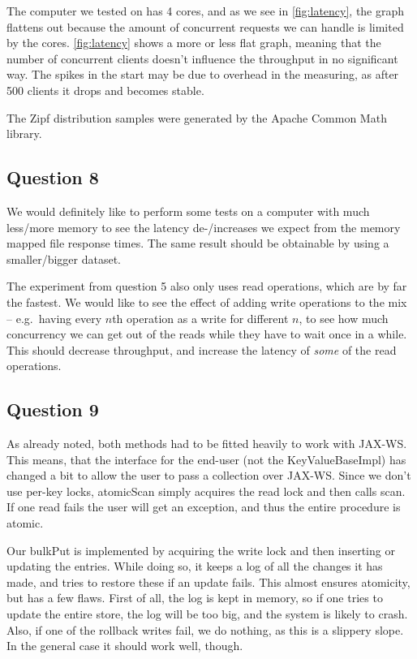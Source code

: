\documentclass[a4paper,final]{article}
\newcommand{\mono}[1]{{\ttfamily#1}}
\begin{document}
The computer we tested on has 4 cores, and as we see in \autoref{fig:latency},
the graph flattens out because the amount of concurrent requests we can handle
is limited by the cores. \autoref{fig:latency} shows a more or less flat graph,
meaning that the number of concurrent clients doesn't influence the throughput
in no significant way. The spikes in the start may be due to overhead in the
measuring, as after 500 clients it drops and becomes stable.

The Zipf distribution samples were generated by the Apache Common Math library.

\subsection*{Question 8}
We would definitely like to perform some tests on a computer with much
less/more memory to see the latency de-/increases we expect from the
memory mapped file response times. The same result should be obtainable by
using a smaller/bigger dataset.

The experiment from question 5 also only uses \mono{read} operations, which
are by far the fastest. We would like to see the effect of adding \mono{write}
operations to the mix -- e.g.\ having every $n$th operation as a write for
different $n$, to see how much concurrency we can get out of the reads while
they have to wait once in a while. This should decrease throughput, and
increase the latency of \emph{some} of the read operations.

\subsection*{Question 9}
As already noted, both methods had to be fitted heavily to work with JAX-WS\@.
This means, that the interface for the end-user (not the
\mono{KeyValueBaseImpl}) has changed a bit to allow the user to pass a
collection over JAX-WS\@. Since we don't use per-key locks, \mono{atomicScan}
simply acquires the read lock and then calls \mono{scan}. If one read fails
the user will get an exception, and thus the entire procedure is atomic.

Our \mono{bulkPut} is implemented by acquiring the write lock and then
inserting or updating the entries. While doing so, it keeps a log of all the
changes it has made, and tries to restore these if an update fails. This
almost ensures atomicity, but has a few flaws. First of all, the log is kept
in memory, so if one tries to update the entire store, the log will be too
big, and the system is likely to crash. Also, if one of the rollback writes
fail, we do nothing, as this is a slippery slope. In the general case it
should work well, though.
\end{document}
